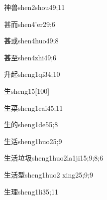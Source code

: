 \begin{verbete}{神兽}{shen2shou4}{9;11}
\end{verbete}

\begin{verbete}{甚而}{shen4'er2}{9;6}
\end{verbete}

\begin{verbete}{甚或}{shen4huo4}{9;8}
\end{verbete}

\begin{verbete}{甚至}{shen4zhi4}{9;6}
\end{verbete}

\begin{verbete}{升起}{sheng1qi3}{4;10}
\end{verbete}

\begin{verbete}{生}{sheng1}{5}[100]
\end{verbete}

\begin{verbete}{生菜}{sheng1cai4}{5;11}
\end{verbete}

\begin{verbete}{生的}{sheng1de5}{5;8}
\end{verbete}

\begin{verbete}{生活}{sheng1huo2}{5;9}
\end{verbete}

\begin{verbete}{生活垃圾}{sheng1huo2la1ji1}{5;9;8;6}
\end{verbete}

\begin{verbete}{生活型}{sheng1huo2 xing2}{5;9;9}
\end{verbete}

\begin{verbete}{生理}{sheng1li3}{5;11}
\end{verbete}

